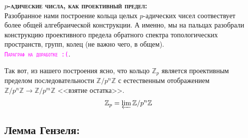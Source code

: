 \documentclass[11pt]{article}
\begin{document}
    \textbf{\textsc{$p$-адические числа, как проективный предел:}}\\
    Разобранное нами построение кольца целых $p$-адических чисел соотвествует более общей алгебраической конструкции. А именно, мы на пальцах разобрали конструкцию
    проективного предела обратного спектра топологических пространств, групп, колец (не важно чего, в общем).\\

    \textcolor{magenta}{\textsc{\texttt{Параграф на доработке :(}}}.

    Так вот, из нашего построения ясно, что кольцо $\mathbb{Z}_p$ является проективным пределом последовательности $\mathbb{Z}/p^n\mathbb{Z}$ с естественным отображением $\mathbb{Z}/p^n\mathbb{Z} \to \mathbb{Z}/p^m\mathbb{Z}$ <<взятие остатка>>.
    \[ \mathbb{Z}_p = \varprojlim \mathbb{Z}/p^n\mathbb{Z} \]
    
    \subsection{Лемма Гензеля:}
\end{document}
